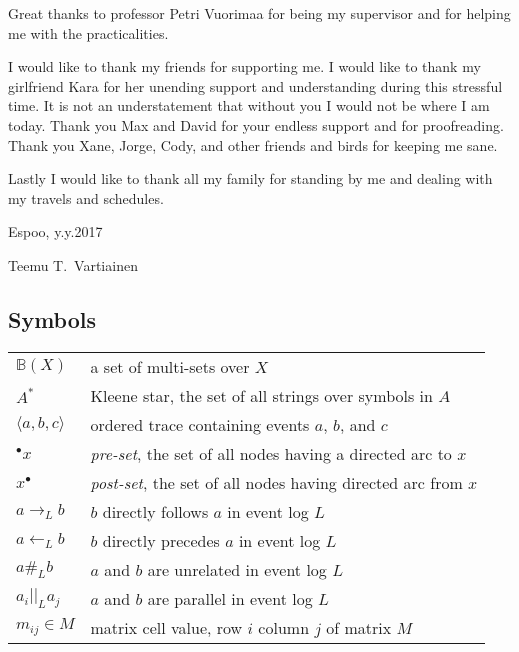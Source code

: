 Great thanks to professor Petri Vuorimaa for being my supervisor and for helping me with the practicalities.

I would like to thank my friends for supporting me.
I would like to thank my girlfriend Kara for her unending support and understanding during this stressful time.
It is not an understatement that without you I would not be where I am today.
Thank you Max and David for your endless support and for proofreading.
Thank you Xane, Jorge, Cody, and other friends and birds for keeping me sane.

Lastly I would like to thank all my family for standing by me and dealing with my travels and schedules.

\vspace{5cm}
Espoo, y.y.2017

\vspace{5mm}
{\hfill Teemu T.\ Vartiainen \hspace{1cm}}

\newpage
\thesistableofcontents


\subsection*{Symbols}

\begin{tabularx}{\linewidth}{l X}
$\mathbb{B}(X)$             & a set of multi-sets over $X$ \\
$A^*$                       & Kleene star, the set of all strings over symbols in $A$ \\
$\langle a,b,c \rangle$     & ordered trace containing events $a$, $b$, and $c$ \\
${}^\bullet x$              & \emph{pre-set}, the set of all nodes having a directed arc to $x$ \\
$x^\bullet$                 & \emph{post-set}, the set of all nodes having directed arc from $x$ \\
$a \rightarrow_L b$         & $b$ directly follows $a$ in event log $L$ \\
$a \leftarrow_L b$          & $b$ directly precedes $a$ in event log $L$ \\
$a \#_L b$                  & $a$ and $b$ are unrelated in event log $L$ \\
$a_i ||_L a_j$              & $a$ and $b$ are parallel in event log $L$ \\
$m_{ij} \in M$              & matrix cell value, row $i$ column $j$ of matrix $M$ \\
\end{tabularx}

